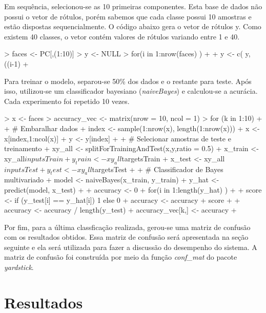 \documentclass[12pt]{article}
\begin{document}
  \par Em sequência, selecionou-se as 10 primeiras componentes. Esta base de dados não possui o vetor de rótulos, porém sabemos que cada classe possui 10 amostras e estão dispostas sequencialmente. O código abaixo gera o vetor de rótulos y. Como existem 40 classes, o vetor contém valores de rótulos variando entre 1 e 40.
\begin{Schunk}
\begin{Sinput}
> faces <- PC[,(1:10)]
> y <- NULL
> for(i in 1:nrow(faces) )
+ {
+   y <- c( y, ((i-1) %
+ }
\end{Sinput}
\end{Schunk}

  \par Para treinar o modelo, separou-se 50\% dos dados e o restante para teste. Após isso, utilizou-se um classificador bayesiano (\textit{naiveBayes}) e calculou-se a acurácia. Cada experimento foi repetido 10 vezes. 
  
\begin{Schunk}
\begin{Sinput}
> x <- faces
> accuracy_vec <- matrix(nrow = 10, ncol = 1)
> for (k in 1:10)
+ {
+   # Embaralhar dados
+   index <- sample(1:nrow(x), length(1:nrow(x)))
+   x <- x[index,1:ncol(x)]
+   y <- y[index]
+   
+   # Selecionar amostras de teste e treinamento
+   xy_all <- splitForTrainingAndTest(x,y,ratio = 0.5)
+   x_train <- xy_all$inputsTrain
+   y_train <- xy_all$targetsTrain
+   x_test <- xy_all$inputsTest
+   y_test <- xy_all$targetsTest
+   
+   # Classificador de Bayes multivariado
+   model <- naiveBayes(x_train, y_train)
+   y_hat <- predict(model, x_test)
+   
+   accuracy <- 0
+   for(i in 1:length(y_hat) )
+   {
+     score <- if (y_test[i] == y_hat[i]) 1 else 0
+     accuracy <- accuracy + score
+   }
+   accuracy <- accuracy / length(y_test)
+   accuracy_vec[k,] <- accuracy 
+ }
\end{Sinput}
\end{Schunk}

\par Por fim, para a última classficação realizada, gerou-se uma matriz de confusão com os resultados obtidos. Essa matriz de confusão será apresentada na seção seguinte e ela será utilizada para fazer a discussão do desempenho do sistema. A matriz de confusão foi construída por meio da função \textit{conf\_mat} do pacote \textit{yardstick}.

\section{Resultados}
\end{document}
